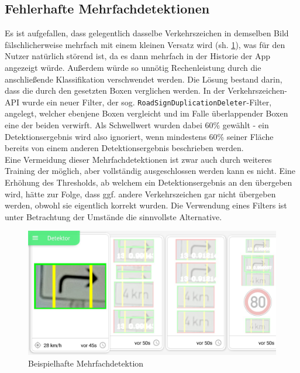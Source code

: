 \documentclass[12pt,a4paper,ngerman,enabledeprecatedfontcommands]{scrreprt}
\begin{document}
\subsection{Fehlerhafte Mehrfachdetektionen}
Es ist aufgefallen, dass gelegentlich dasselbe Verkehrszeichen in demselben Bild fälschlicher\-weise mehrfach mit einem kleinen Versatz  wird (sh. \cref{fig:mehrfachdetektion}), was für den \gls{Nutzer} natürlich störend ist, da es dann mehrfach in der Historie der App angezeigt würde. Außerdem würde so unnötig Rechenleistung durch die anschließende \gls{Klassifikation} verschwendet werden. Die Lösung bestand darin, dass die durch den  gesetzten Boxen verglichen werden. In der \gls{Verkehrszeichen-API} wurde ein neuer Filter, der sog. \texttt{RoadSignDuplicationDeleter}-Filter, angelegt, welcher ebenjene Boxen vergleicht und im Falle überlappender Boxen eine der beiden verwirft. Als Schwellwert wurden dabei 60\% gewählt - ein \gls{Detektion}sergebnis wird also ignoriert, wenn mindestens 60\% seiner Fläche bereits von einem anderen \gls{Detektion}sergebnis beschrieben werden.\\

Eine Vermeidung dieser Mehrfachdetektionen ist zwar auch durch weiteres Training der  möglich, aber vollständig ausgeschlossen werden kann es nicht. Eine Erhöhung des Thresholds, ab welchem ein \gls{Detektion}sergebnis an den  übergeben wird, hätte zur Folge, dass ggf. andere Verkehrszeichen gar nicht übergeben werden, obwohl sie eigentlich korrekt  wurden. Die Verwendung eines Filters ist unter Betrachtung der Umstände die sinnvollste Alternative.\\

\begin{figure}[H]
\centering
\includegraphics[width=0.9\linewidth]{Reviewdokument/Grafiken/mehrfachdetektion.jpeg}
\caption{Beispielhafte Mehrfachdetektion}
\label{fig:mehrfachdetektion}
\end{figure}
\end{document}
